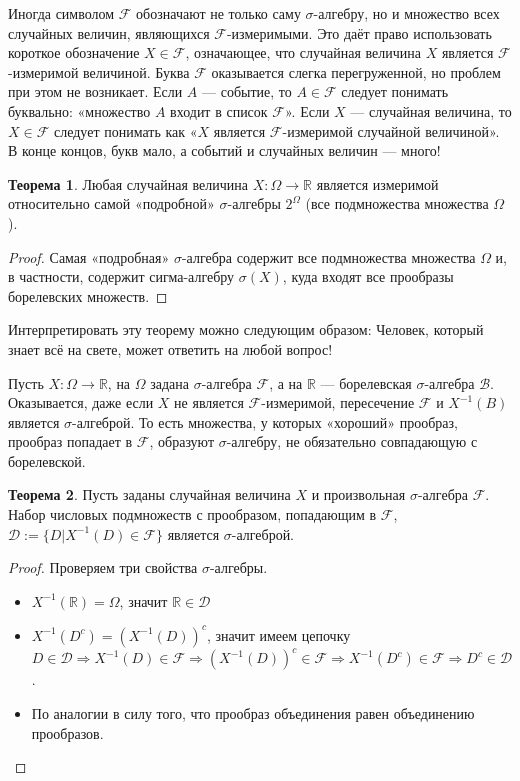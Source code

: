 \documentclass[pdftex, 12pt, a4paper]{article}
\def\R{\ensuremath{\mathbb{R}}} %
\def\F{\ensuremath{\mathcal{F}}} %
\def\B{\ensuremath{\mathcal{B}}} %
\def\s{\ensuremath{\sigma}}
\renewcommand{\to}{\rightarrow}
\theoremstyle{definition} %
\newtheorem{myth}{Теорема}
\numberwithin{problem}{section}
\numberwithin{blits}{section}
\begin{document}
Иногда символом $\mathcal{F}$ обозначают не только саму $\sigma$-алгебру, но и множество всех случайных величин,
являющихся $\mathcal{F}$-измеримыми. Это даёт право использовать короткое обозначение $X \in \mathcal{F}$, означающее, что
случайная величина $X$ является $\mathcal{F}$-измеримой величиной. Буква $\F$ оказывается слегка перегруженной, но проблем при этом не возникает. Если $A$ --- событие, то $A\in \F$ следует понимать буквально: «множество $A$ входит в список $\F$». Если $X$ --- случайная величина, то $X\in \F$ следует понимать как «$X$ является $\F$-измеримой случайной величиной». В конце концов, букв мало, а событий и случайных величин --- много!

\begin{myth} Любая случайная величина $X:\Omega\rightarrow \R$ является измеримой относительно самой «подробной» $\sigma$-алгебры $2^\Omega$ (все подмножества множества $\Omega$).
\end{myth}

\begin{proof} Самая «подробная» \s-алгебра содержит все подмножества множества $\Omega$ и, в частности, содержит сигма-алгебру $ \sigma(X) $, куда входят все прообразы борелевских множеств.
\end{proof}

Интерпретировать эту теорему можно следующим образом: Человек, который знает всё на свете, может ответить на любой вопрос! 

Пусть $X:\Omega\to\mathbb{R}$, на $\Omega$ задана \s-алгебра $\F$, а на $\R$ --- борелевская \s-алгебра $\B$. Оказывается, даже если $X$ не является \F-измеримой, пересечение $\F$ и $X^{-1}(B)$ является \s-алгеброй. То есть множества, у которых «хороший» прообраз, прообраз попадает в \F, образуют \s-алгебру, не обязательно совпадающую с борелевской.


\begin{myth} Пусть заданы случайная величина $X$ и произвольная \s-алгебра \F. Набор числовых подмножеств с прообразом, попадающим в \F, $\mathcal{D}:=\{D|X^{-1}(D)\in\F\}$ является \s-алгеброй.
\end{myth}
\begin{proof} Проверяем три свойства \s-алгебры.
\begin{itemize}

\item $X^{-1}(\R)=\Omega$, значит $\R\in\mathcal{D}$

\item $X^{-1}(D^{c})=(X^{-1}(D))^{c}$, значит имеем цепочку $D\in\mathcal{D}\Rightarrow X^{-1}(D)\in\F \Rightarrow (X^{-1}(D))^{c}\in\F \Rightarrow X^{-1}(D^{c})\in\F \Rightarrow D^{c}\in \mathcal{D} $.

\item  По аналогии в силу того, что прообраз объединения равен объединению прообразов.
\end{itemize}
\end{proof}
\end{document}

